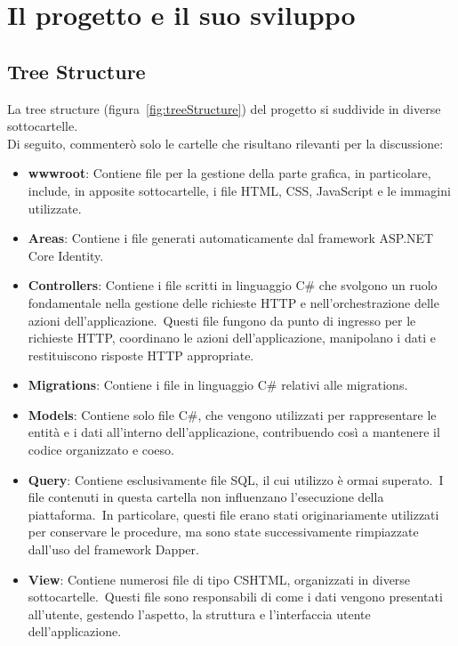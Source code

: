 \chapter{Il progetto e il suo sviluppo}\label{chapter:formattazione}
%
\section{Tree Structure}\label{sec:cap_sec_subsec}

La tree structure (figura~\ref{fig:treeStructure}) del progetto si suddivide in diverse sottocartelle.\\ 
Di seguito, commenterò solo le cartelle che risultano rilevanti per la discussione:
\begin{itemize}
	\item \textbf{wwwroot}: Contiene file per la gestione della parte grafica, 
	in particolare, include, in apposite sottocartelle, i file HTML, CSS, JavaScript e le immagini utilizzate. 
	\item \textbf{Areas}: Contiene i file generati automaticamente dal framework ASP.NET Core Identity.
	\item \textbf{Controllers}: Contiene i file scritti in linguaggio C\# che svolgono un 
	ruolo fondamentale nella gestione delle richieste HTTP e nell'orchestrazione 
	delle azioni dell'applicazione.\ Questi file fungono da punto di ingresso per 
	le richieste HTTP, coordinano le azioni dell'applicazione, manipolano i dati e 
	restituiscono risposte HTTP appropriate.
	\item \textbf{Migrations}: Contiene i file in linguaggio C\# relativi alle migrations.
	\item \textbf{Models}: Contiene solo file C\#, che vengono utilizzati per rappresentare 
	le entità e i dati all'interno dell'applicazione, contribuendo così a mantenere il 
	codice organizzato e coeso.
	\item \textbf{Query}: Contiene esclusivamente file SQL, il cui utilizzo è ormai superato.\ 
	I file contenuti in questa cartella non influenzano l'esecuzione della piattaforma.\
	In particolare, questi file erano stati originariamente utilizzati per conservare le procedure, 
	ma sono state successivamente rimpiazzate dall'uso del framework Dapper. 
	\item \textbf{View}: Contiene numerosi file di tipo CSHTML, organizzati in diverse 
	sottocartelle.\ Questi file sono responsabili di come i dati vengono presentati 
	all'utente, gestendo l'aspetto, la struttura e l'interfaccia utente dell'applicazione.
\end{itemize}
